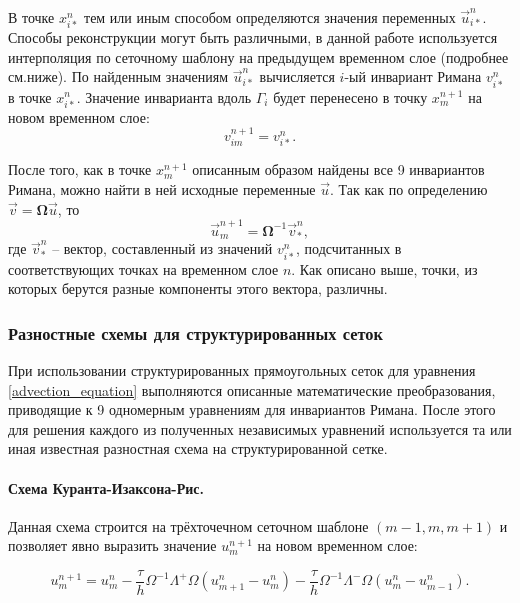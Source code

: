 В точке $x_{i*}^n$ тем или иным способом определяются значения переменных $\vec u_{i*}^n$. Способы реконструкции могут быть различными, в данной работе используется интерполяция по сеточному шаблону на предыдущем временном слое (подробнее см.ниже). По найденным значениям $\vec u_{i*}^n$ вычисляется $i$-ый инвариант Римана $v_{i*}^n$ в точке $x_{i*}^n$. Значение инварианта вдоль $\Gamma_i$ будет перенесено в точку $x_m^{n+1}$ на новом временном слое:
\begin{equation}
v_{im}^{n+1} = v_{i*}^n.
\end{equation}

После того, как в точке $x_m^{n+1}$ описанным образом найдены все 9 инвариантов Римана, можно найти в ней исходные переменные $\vec u$. Так как по определению ${\vec v}=\mathbf\Omega{\vec u}$, то
\begin{equation}
{\vec u}_m^{n+1}=\mathbf\Omega^{-1}{\vec v}_*^n,
\end{equation}
где ${\vec v}_*^n$ -- вектор, составленный из значений $v_{i*}^n$, подсчитанных в соответствующих точках на временном слое $n$. Как описано выше, точки, из которых берутся разные компоненты этого вектора, различны.


\subsubsection{Разностные схемы для структурированных сеток}

При использовании структурированных прямоугольных сеток для уравнения \eqref{advection_equation} выполняются описанные математические преобразования, приводящие к 9 одномерным уравнениям для инвариантов Римана. После этого для решения каждого из полученных независимых уравнений используется та или иная известная разностная схема на структурированной сетке.

\paragraph{Схема Куранта-Изаксона-Рис.} Данная схема строится на трёхточечном сеточном шаблоне $(m-1, m, m+1)$ и позволяет явно выразить значение $u_m^{n+1}$ на новом временном слое:

\begin{equation}
	\label{CIR scheme}
	u^{n+1}_m = u^n_m - \frac{\tau}{h} \Omega^{-1} \Lambda^+ \Omega (u^n_{m+1} - u^n_m) 
	- \frac{\tau}{h} \Omega^{-1} \Lambda^- \Omega (u^n_m - u^n_{m-1}) .
\end{equation}

